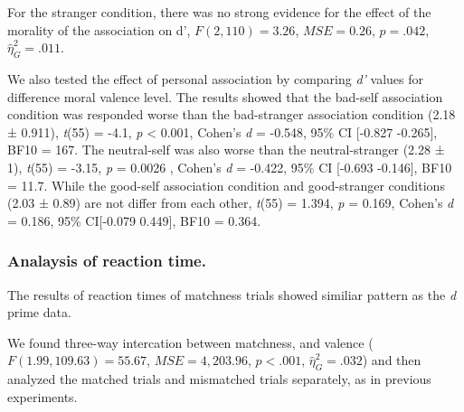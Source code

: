 \documentclass[man]{apa6}
\begin{document}
For the stranger condition, there was no strong evidence for the effect of the morality of the association on d', \(F(2, 110) = 3.26\), \(\mathit{MSE} = 0.26\), \(p = .042\), \(\hat{\eta}^2_G = .011\).

We also tested the effect of personal association by comparing \emph{d'} values for difference moral valence level. The results showed that the bad-self association condition was responded worse than the bad-stranger association condition (2.18 ± 0.911), \emph{t}(55) = -4.1, \emph{p} \textless{} 0.001, Cohen's \emph{d} = -0.548, 95\% CI {[}-0.827 -0.265{]}, BF10 = 167. The neutral-self was also worse than the neutral-stranger (2.28 ± 1), \emph{t}(55) = -3.15, \emph{p} = 0.0026 , Cohen's \emph{d} = -0.422, 95\% CI {[}-0.693 -0.146{]}, BF10 = 11.7. While the good-self association condition and good-stranger conditions (2.03 ± 0.89) are not differ from each other, \emph{t}(55) = 1.394, \emph{p} = 0.169, Cohen's \emph{d} = 0.186, 95\% CI{[}-0.079 0.449{]}, BF10 = 0.364.

\hypertarget{analaysis-of-reaction-time.-4}{%
\subsubsection{Analaysis of reaction time.}\label{analaysis-of-reaction-time.-4}}

The results of reaction times of matchness trials showed similiar pattern as the \emph{d} prime data.

We found three-way intercation between matchness, and valence (\(F(1.99, 109.63) = 55.67\), \(\mathit{MSE} = 4,203.96\), \(p < .001\), \(\hat{\eta}^2_G = .032\)) and then analyzed the matched trials and mismatched trials separately, as in previous experiments.
\end{document}
